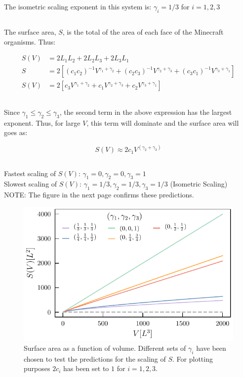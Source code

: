 \documentclass{article}
\begin{document}
The isometric scaling exponent in this system is: $\gamma_i = 1/3$ for $i={1,2,3}$ \\

\subsection{}

The surface area, $S$, is the total of the area of each face of the Minecraft organisms. Thus:

\begin{align}
S(V) &= 2L_1L_2 + 2L_2L_3 + 2L_3L_1 \\
S &= 2[(c_1c_2)^{-1} V^{\gamma_1 + \gamma_2} + (c_2c_3)^{-1} V^{\gamma_2 + \gamma_3} + (c_3c_1)^{-1} V^{\gamma_3 + \gamma_1}] \\
S(V) &= 2[c_3V^{\gamma_1 + \gamma_2} + c_1 V^{\gamma_2 + \gamma_3} + c_2 V^{\gamma_3 + \gamma_1}]
\end{align}

\subsection{}

Since $\gamma_1 \leq \gamma_2 \leq \gamma_3$, the second term in the above expression has the largest exponent. Thus, for large $V$, this term will dominate and the surface area will goes as:

\[ S(V) \approx 2c_1 V^{(\gamma_2+\gamma_3)}\]

\subsection{}

Fastest scaling of $S(V)$: $\gamma_1 = 0, \gamma_2 = 0, \gamma_3 = 1$ \\
Slowest scaling of $S(V)$: $\gamma_1 = 1/3, \gamma_2 = 1/3, \gamma_3 = 1/3$ (Isometric Scaling) \\

NOTE: The figure in the next page confirms these predictions.


\begin{figure}[h!]
  \includegraphics[width=\linewidth]{Q08/minecraftConvergence.pdf}
  \caption{Surface area as a function of volume. Different sets of $\gamma_i$ have been chosen to test the predictions for the scaling of $S$. For plotting purposes $2c_i$ has been set to $1$ for $i={1,2,3}$. }
  \label{fig:minecraftConvergence}
\end{figure}
\end{document}

